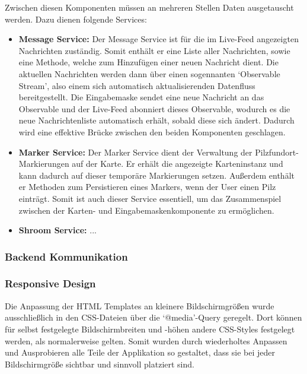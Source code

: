 \documentclass[../main.tex]{subfiles}
\begin{document}
Zwischen diesen Komponenten müssen an mehreren Stellen Daten ausgetauscht werden. Dazu dienen folgende Services:

\begin{itemize}

	\item \textbf{Message Service:}
	      Der Message Service ist für die im Live-Feed angezeigten Nachrichten zuständig. Somit enthält er eine Liste aller Nachrichten, sowie eine Methode,
	      welche zum Hinzufügen einer neuen Nachricht dient. Die aktuellen Nachrichten werden dann über einen sogennanten `Observable Stream', also einem
	      sich automatisch aktualisierenden Datenfluss bereitgestellt. Die Eingabemaske sendet eine neue Nachricht an das Observable und der Live-Feed
	      abonniert dieses Observable, wodurch es die neue Nachrichtenliste automatisch erhält, sobald diese sich ändert. Dadurch wird eine effektive
	      Brücke zwischen den beiden Komponenten geschlagen.

	\item \textbf{Marker Service:}
	      Der Marker Service dient der Verwaltung der Pilzfundort-Markierungen auf der Karte. Er erhält die angezeigte Karteninstanz und kann dadurch auf
	      dieser temporäre Markierungen setzen. Außerdem enthält er Methoden zum Persistieren eines Markers, wenn der User einen Pilz einträgt. Somit ist
	      auch dieser Service essentiell, um das Zusammenspiel zwischen der Karten- und Eingabemaskenkomponente zu ermöglichen.

	\item \textbf{Shroom Service:}
	      ...

\end{itemize}

\subsubsection{Backend Kommunikation}

\subsubsection{Responsive Design}

Die Anpassung der HTML Templates an kleinere Bildschirmgrößen wurde ausschließlich in den CSS-Dateien über die `@media'-Query geregelt. Dort können für
selbst festgelegte Bildschirmbreiten und -höhen andere CSS-Styles festgelegt werden, als normalerweise gelten. Somit wurden durch wiederholtes Anpassen
und Ausprobieren alle Teile der Applikation so gestaltet, dass sie bei jeder Bildschirmgröße sichtbar und sinnvoll platziert sind.
\end{document}
